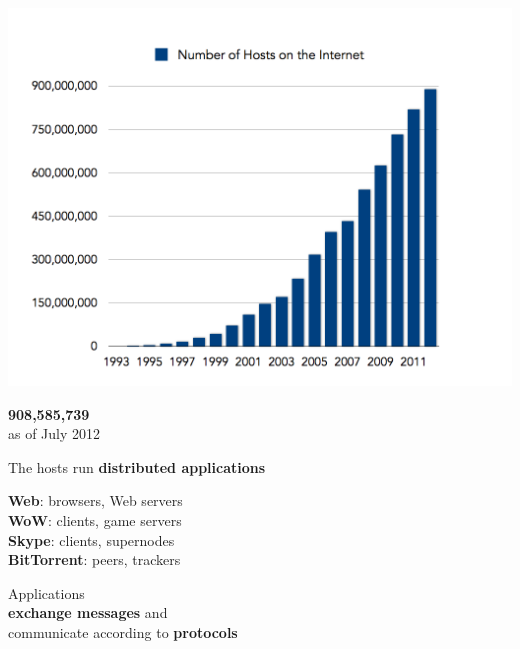 \begin{frame}[plain]\begin{center}\large
		\includegraphics[width=\linewidth]{figures/num-of-hosts-chart.png}
\end{center}\end{frame}

\begin{frame}
\begin{center}
\Huge
\textbf{908,585,739}\\
\large
as of July 2012
\end{center}
\end{frame}

\begin{frame}\begin{center}
\large
The hosts run \textbf{distributed applications}
\end{center}\end{frame}

\begin{frame}
\large
\textbf{Web}: browsers, Web servers\\
\textbf{WoW}: clients, game servers\\
\textbf{Skype}: clients, supernodes\\
\textbf{BitTorrent}: peers, trackers\\
\end{frame}

\begin{frame}
\begin{center}
\large
Applications\\\textbf{exchange messages} and\\ communicate according to \textbf{protocols}
\end{center}
\end{frame}

